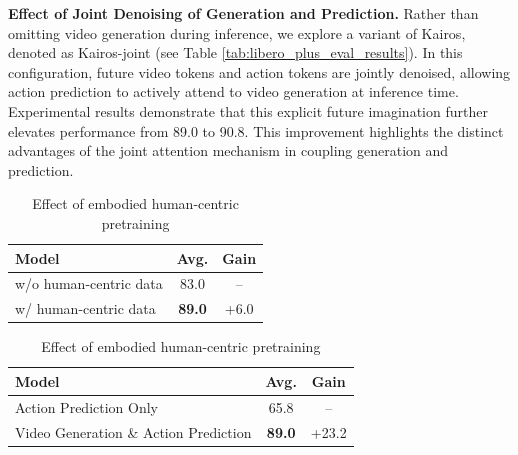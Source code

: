 \documentclass{llmxive}
\begin{document}
\textbf{Effect of Joint Denoising of Generation and Prediction.} 
Rather than omitting video generation during inference, we explore a variant of Kairos, denoted as Kairos-joint (see Table \ref{tab:libero_plus_eval_results}). In this configuration, future video tokens and action tokens are jointly denoised, allowing action prediction to actively attend to video generation at inference time. Experimental results demonstrate that this explicit future imagination further elevates performance from 89.0 to 90.8. This improvement highlights the distinct advantages of the joint attention mechanism in coupling generation and prediction.



\begin{table}[t]
\centering

\begin{minipage}[t]{0.48\textwidth}
\vspace{0pt}
\centering
\footnotesize
\setlength{\tabcolsep}{4pt}

\begin{tabular}{lcc}
\toprule
\textbf{Model} &
\textbf{Avg.} &
\textbf{Gain} \\
\midrule
w/o human-centric data & 83.0 & -- \\
w/ human-centric data & \textbf{89.0} & +6.0 \\
\bottomrule
\end{tabular}

\end{minipage}
\hfill
\begin{minipage}[t]{0.48\textwidth}
\vspace{0pt}
\centering
\caption{Effect of Joint Training of Generation and Prediction}
\label{tab:joint_training}

\footnotesize
\setlength{\tabcolsep}{4pt}

\begin{tabular}{lcc}
\toprule
\textbf{Model} & \textbf{Avg.} & \textbf{Gain} \\
\midrule
Action Prediction Only & 65.8 & -- \\
Video Generation \& Action Prediction & \textbf{89.0} & +23.2 \\
\bottomrule
\end{tabular}

\end{minipage}

\caption{Effect of embodied human-centric pretraining}
\label{tab:human_pretraining}
\end{table}
\end{document}
